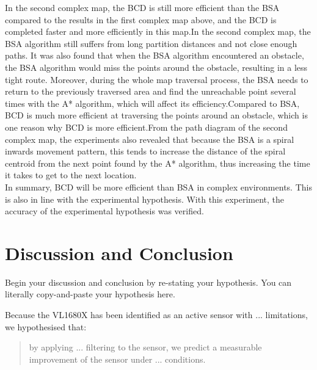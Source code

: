 \documentclass[conference]{IEEEtran}
\begin{document}
In the second complex map, the BCD is still more efficient than the BSA compared to the results in the first complex map above, and the BCD is completed faster and more efficiently in this map.In the second complex map, the BSA algorithm still suffers from long partition distances and not close enough paths. It was also found that when the BSA algorithm encountered an obstacle, the BSA algorithm would miss the points around the obstacle, resulting in a less tight route. Moreover, during the whole map traversal process, the BSA needs to return to the previously traversed area and find the unreachable point several times with the A* algorithm, which will affect its efficiency.Compared to BSA, BCD is much more efficient at traversing the points around an obstacle, which is one reason why BCD is more efficient.From the path diagram of the second complex map, the experiments also revealed that because the BSA is a spiral inwards movement pattern, this tends to increase the distance of the spiral centroid from the next point found by the A* algorithm, thus increasing the time it takes to get to the next location.\\
In summary, BCD will be more efficient than BSA in complex environments. This is also in line with the experimental hypothesis. With this experiment, the accuracy of the experimental hypothesis was verified.


\section{Discussion and Conclusion}

Begin your discussion and conclusion by re-stating your hypothesis.  You can literally copy-and-paste your hypothesis here.  

Because the VL1680X has been identified as an active sensor with ... limitations, we hypothesised that:
\begin{quote}
    by applying ... filtering to the sensor, we predict a measurable improvement of the sensor under ... conditions.  
\end{quote}


 

\end{document}
